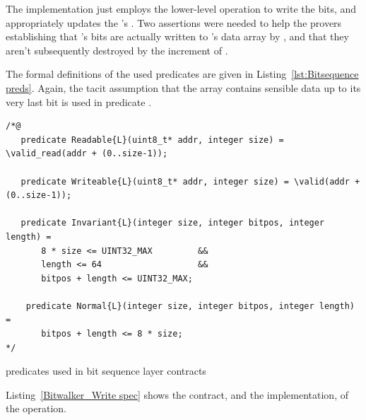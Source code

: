 The implementation just employs the lower-level operation
 to
write the bits, and appropriately updates the 's
.
%
Two assertions were needed to help the provers establishing that
's
bits are actually written to 's data array by
, and that they aren't subsequently destroyed by
the increment of .



The formal definitions of the used \acsl predicates are given in
Listing~\ref{lst:Bitsequence preds}.
%
Again, the tacit assumption that the array contains sensible data
up to its very last bit is used in predicate .



\begin{listing}[hbt]
\begin{minipage}{0.99\textwidth}
\begin{lstlisting}[style=acsl-block]
/*@
   predicate Readable{L}(uint8_t* addr, integer size) = \valid_read(addr + (0..size-1));

   predicate Writeable{L}(uint8_t* addr, integer size) = \valid(addr + (0..size-1));

   predicate Invariant{L}(integer size, integer bitpos, integer length) =
       8 * size <= UINT32_MAX         &&
       length <= 64                   &&
       bitpos + length <= UINT32_MAX;

    predicate Normal{L}(integer size, integer bitpos, integer length) =
       bitpos + length <= 8 * size;
*/
\end{lstlisting}
\end{minipage}
\caption{\label{lst:Bitsequence preds} \acsl predicates used in bit sequence layer contracts}
\end{listing}


\FloatBarrier


Listing~\ref{Bitwalker_Write spec} shows the contract, and the
implementation, of the
 operation.

